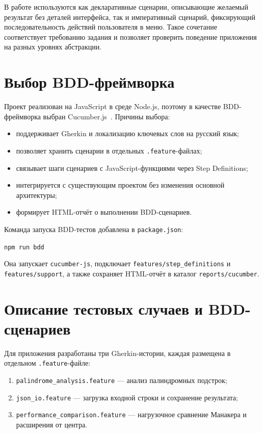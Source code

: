 В работе используются как декларативные сценарии, описывающие желаемый результат без деталей интерфейса, так и императивный сценарий, фиксирующий последовательность действий пользователя в меню. Такое сочетание соответствует требованию задания и позволяет проверить поведение приложения на разных уровнях абстракции.

\section{Выбор BDD-фреймворка} \label{ch1:sec2}

Проект реализован на JavaScript в среде Node.js, поэтому в качестве BDD-фреймворка выбран Cucumber.js~\cite{cucumber-js}. Причины выбора:
\begin{itemize}
    \item поддерживает Gherkin и локализацию ключевых слов на русский язык;
    \item позволяет хранить сценарии в отдельных \texttt{.feature}-файлах;
    \item связывает шаги сценариев с JavaScript-функциями через Step Definitions;
    \item интегрируется с существующим проектом без изменения основной архитектуры;
    \item формирует HTML-отчёт о выполнении BDD-сценариев.
\end{itemize}

Команда запуска BDD-тестов добавлена в \texttt{package.json}:
\begin{center}
\texttt{npm run bdd}
\end{center}

Она запускает \texttt{cucumber-js}, подключает \texttt{features/step\_definitions} и \texttt{features/support}, а также сохраняет HTML-отчёт в каталог \texttt{reports/cucumber}.

\section{Описание тестовых случаев и BDD-сценариев} \label{ch1:sec3}

Для приложения разработаны три Gherkin-истории, каждая размещена в отдельном \texttt{.feature}-файле:
\begin{enumerate}
    \item \texttt{palindrome\_analysis.feature} --- анализ палиндромных подстрок;
    \item \texttt{json\_io.feature} --- загрузка входной строки и сохранение результата;
    \item \texttt{performance\_comparison.feature} --- нагрузочное сравнение Манакера и расширения от центра.
\end{enumerate}


